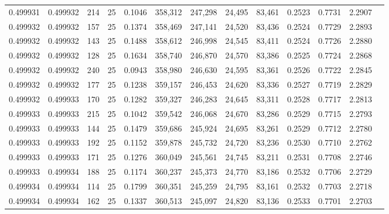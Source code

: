 \begin{tabular}{rrrrrrrrrrrrr}
0.499931 & 0.499932 &   214 &  25 &                                     0.1046 & 358,312 & 247,298 &  24,495 &  83,461 & 0.2523 & 0.7731 & 2.2907 \\
0.499932 & 0.499932 &   157 &  25 &                                     0.1374 & 358,469 & 247,141 &  24,520 &  83,436 & 0.2524 & 0.7729 & 2.2893 \\
0.499932 & 0.499932 &   143 &  25 &                                     0.1488 & 358,612 & 246,998 &  24,545 &  83,411 & 0.2524 & 0.7726 & 2.2880 \\
0.499932 & 0.499932 &   128 &  25 &                                     0.1634 & 358,740 & 246,870 &  24,570 &  83,386 & 0.2525 & 0.7724 & 2.2868 \\
0.499932 & 0.499932 &   240 &  25 &                                     0.0943 & 358,980 & 246,630 &  24,595 &  83,361 & 0.2526 & 0.7722 & 2.2845 \\
0.499932 & 0.499932 &   177 &  25 &                                     0.1238 & 359,157 & 246,453 &  24,620 &  83,336 & 0.2527 & 0.7719 & 2.2829 \\
0.499932 & 0.499933 &   170 &  25 &                                     0.1282 & 359,327 & 246,283 &  24,645 &  83,311 & 0.2528 & 0.7717 & 2.2813 \\
0.499933 & 0.499933 &   215 &  25 &                                     0.1042 & 359,542 & 246,068 &  24,670 &  83,286 & 0.2529 & 0.7715 & 2.2793 \\
0.499933 & 0.499933 &   144 &  25 &                                     0.1479 & 359,686 & 245,924 &  24,695 &  83,261 & 0.2529 & 0.7712 & 2.2780 \\
0.499933 & 0.499933 &   192 &  25 &                                     0.1152 & 359,878 & 245,732 &  24,720 &  83,236 & 0.2530 & 0.7710 & 2.2762 \\
0.499933 & 0.499933 &   171 &  25 &                                     0.1276 & 360,049 & 245,561 &  24,745 &  83,211 & 0.2531 & 0.7708 & 2.2746 \\
0.499933 & 0.499934 &   188 &  25 &                                     0.1174 & 360,237 & 245,373 &  24,770 &  83,186 & 0.2532 & 0.7706 & 2.2729 \\
0.499934 & 0.499934 &   114 &  25 &                                     0.1799 & 360,351 & 245,259 &  24,795 &  83,161 & 0.2532 & 0.7703 & 2.2718 \\
0.499934 & 0.499934 &   162 &  25 &                                     0.1337 & 360,513 & 245,097 &  24,820 &  83,136 & 0.2533 & 0.7701 & 2.2703 \\

\end{tabular}
